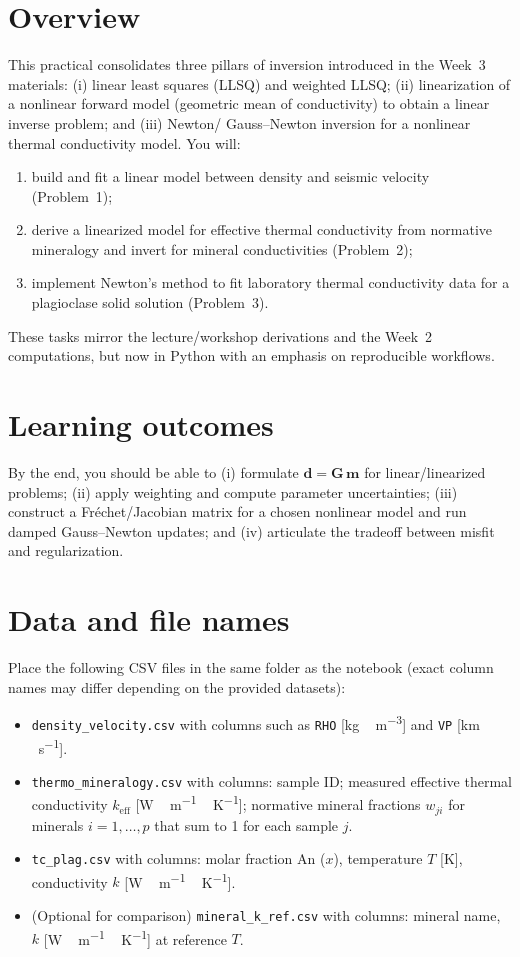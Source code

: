 \documentclass[11pt,a4paper]{article}
\author{Potential Fields \& Geothermics}
\begin{document}
\maketitle

\section*{Overview}
This practical consolidates three pillars of inversion introduced in the Week~3 materials: (i) linear least squares (LLSQ) and weighted LLSQ; (ii) linearization of a nonlinear forward model (geometric mean of conductivity) to obtain a linear inverse problem; and (iii) Newton/ Gauss--Newton inversion for a nonlinear thermal conductivity model. You will:
\begin{enumerate}
  \item build and fit a linear model between density and seismic velocity (Problem~1);
  \item derive a linearized model for effective thermal conductivity from normative mineralogy and invert for mineral conductivities (Problem~2);
  \item implement Newton's method to fit laboratory thermal conductivity data for a plagioclase solid solution (Problem~3).
\end{enumerate}
These tasks mirror the lecture/workshop derivations and the Week~2 computations, but now in Python with an emphasis on reproducible workflows.

\section*{Learning outcomes}
By the end, you should be able to (i) formulate $\mathbf d = \mathbf G\,\mathbf m$ for linear/linearized problems; (ii) apply weighting and compute parameter uncertainties; (iii) construct a Fréchet/Jacobian matrix for a chosen nonlinear model and run damped Gauss--Newton updates; and (iv) articulate the tradeoff between misfit and regularization.

\section*{Data and file names}
Place the following CSV files in the same folder as the notebook (exact column names may differ depending on the provided datasets):
\begin{itemize}
  \item \texttt{density\_velocity.csv} with columns such as \texttt{RHO} [\si{kg\,m^{-3}}] and \texttt{VP} [\si{km\,s^{-1}}].
  \item \texttt{thermo\_mineralogy.csv} with columns: sample ID; measured effective thermal conductivity $k_\text{eff}$ [\si{W\,m^{-1}\,K^{-1}}]; normative mineral fractions $w_{j i}$ for minerals $i=1,\dots,p$ that sum to 1 for each sample $j$.
  \item \texttt{tc\_plag.csv} with columns: molar fraction An ($x$), temperature $T$ [K], conductivity $k$ [\si{W\,m^{-1}\,K^{-1}}].
  \item (Optional for comparison) \texttt{mineral\_k\_ref.csv} with columns: mineral name, $k$ [\si{W\,m^{-1}\,K^{-1}}] at reference $T$.
\end{itemize}
\end{document}
